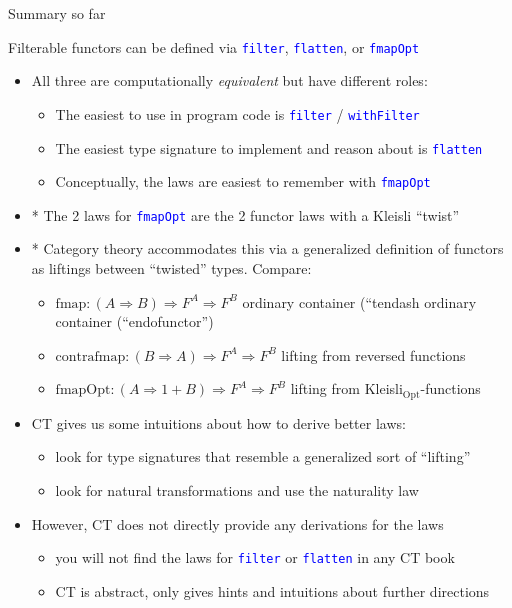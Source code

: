 \documentclass[english]{beamer}
\begin{document}
\begin{frame}{Summary so far}

Filterable functors can be defined via \texttt{\textcolor{blue}{\footnotesize{}filter}},
\texttt{\textcolor{blue}{\footnotesize{}flatten}}, or \texttt{\textcolor{blue}{\footnotesize{}fmapOpt}} 
\begin{itemize}
\item All three are computationally \emph{equivalent} but have different
roles:
\begin{itemize}
\item The easiest to use in program code is \texttt{\textcolor{blue}{\footnotesize{}filter}}
/ \texttt{\textcolor{blue}{\footnotesize{}withFilter}} 
\item The easiest type signature to implement and reason about is \texttt{\textcolor{blue}{\footnotesize{}flatten}} 
\item Conceptually, the laws are easiest to remember with \texttt{\textcolor{blue}{\footnotesize{}fmapOpt}} 
\end{itemize}
\item {*} The 2 laws for \texttt{\textcolor{blue}{\footnotesize{}fmapOpt}}
are the 2 functor laws with a Kleisli ``twist''
\item {*} Category theory accommodates this via a generalized definition
of functors as liftings between ``twisted'' types. Compare:
\begin{itemize}
\item $\text{fmap}:\left(A\Rightarrow B\right)\Rightarrow F^{A}\Rightarrow F^{B}$
\textendash{} ordinary container (``tendash{} ordinary container (``endofunctor'')
\item $\text{contrafmap}:\left(B\Rightarrow A\right)\Rightarrow F^{A}\Rightarrow F^{B}$
\textendash{} lifting from reversed functions
\item $\text{fmapOpt}:\left(A\Rightarrow1+B\right)\Rightarrow F^{A}\Rightarrow F^{B}$
\textendash{} lifting from Kleisli$_{\text{Opt}}$-functions 
\end{itemize}
\item CT gives us some intuitions about how to derive better laws:
\begin{itemize}
\item look for type signatures that resemble a generalized sort of ``lifting''
\item look for natural transformations and use the naturality law
\end{itemize}
\item However, CT does not directly provide any derivations for the laws
\begin{itemize}
\item you will not find the laws for \texttt{\textcolor{blue}{\footnotesize{}filter}}
or \texttt{\textcolor{blue}{\footnotesize{}flatten}} in any CT book
\item CT is abstract, only gives hints and intuitions about further directions
\end{itemize}
\end{itemize}
\end{frame}
\end{document}
